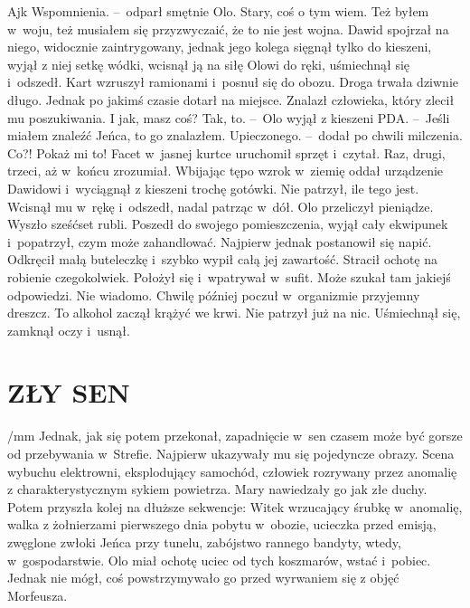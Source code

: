 \documentclass[../MAIN.tex]{subfiles}
\begin{document}
\xx Aj\3k Wspomnienia. --~odparł smętnie Olo.
\xx Stary, coś o tym wiem. Też byłem w~woju, też musiałem się przyzwyczaić, że to nie jest wojna.
\qd
\hspace{6em} Dawid spojrzał na niego, widocznie zaintrygowany, jednak jego kolega sięgnął tylko do kieszeni, wyjął z niej setkę wódki, wcisnął ją na siłę Olowi do ręki, uśmiechnął się i~odszedł. Kart wzruszył ramionami i~posnuł się do obozu. Droga trwała dziwnie długo. Jednak po jakimś czasie dotarł na miejsce. Znalazł człowieka, który zlecił mu poszukiwania.
\pp
\sd
\xx I jak, masz coś?
\xx Tak, to. --~Olo wyjął z kieszeni PDA. --~Jeśli miałem znaleźć Jeńca, to go znalazłem. Upieczonego. --~dodał po chwili milczenia.
\xx Co?! Pokaż mi to!
\qd
\hspace{9.5em} Facet w~jasnej kurtce uruchomił sprzęt i~czytał. Raz, drugi, trzeci, aż w~końcu zrozumiał. Wbijając tępo wzrok w~ziemię oddał urządzenie Dawidowi i~wyciągnął z kieszeni trochę gotówki. Nie patrzył, ile tego jest. Wcisnął mu w~rękę i~odszedł, nadal patrząc w~dół. Olo przeliczył pieniądze. Wyszło sześćset rubli. Poszedł do swojego pomieszczenia, wyjął cały ekwipunek i~popatrzył, czym może zahandlować. Najpierw jednak postanowił się napić. Odkręcił małą buteleczkę i~szybko wypił całą jej zawartość. Stracił ochotę na robienie czegokolwiek. Położył się i~wpatrywał w~sufit. Może szukał tam jakiejś odpowiedzi. Nie wiadomo. Chwilę później poczuł w~organizmie przyjemny dreszcz. To alkohol zaczął krążyć we krwi. Nie patrzył już na nic. Uśmiechnął się, zamknął oczy i~usnął.
\section*{ZŁY SEN}
/mm Jednak, jak się potem przekonał, zapadnięcie w~sen czasem może być gorsze od przebywania w~Strefie. Najpierw ukazywały mu się pojedyncze obrazy. Scena wybuchu elektrowni, eksplodujący samochód, człowiek rozrywany przez anomalię z charakterystycznym sykiem powietrza. Mary nawiedzały go jak złe duchy. Potem przyszła kolej na dłuższe sekwencje: Witek wrzucający śrubkę w~anomalię, walka z żołnierzami pierwszego dnia pobytu w~obozie, ucieczka przed emisją, zwęglone zwłoki Jeńca przy tunelu, zabójstwo rannego bandyty, wtedy, w~gospodarstwie. Olo miał ochotę uciec od tych koszmarów, wstać i~pobiec. Jednak nie mógł, coś powstrzymywało go przed wyrwaniem się z objęć Morfeusza.
\end{document}
